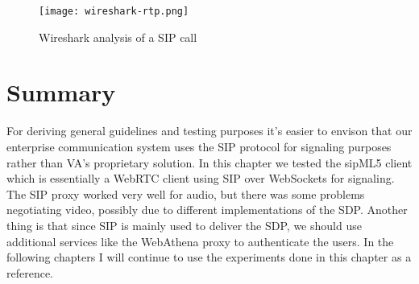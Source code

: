 \begin{figure}[here]
\centerline{\texttt{[image: wireshark-rtp.png]}}
\caption{Wireshark analysis of a SIP call}
\label{fig:wireshark-sip-call}
\end{figure}

\newpage
\section{Summary}
For deriving general guidelines and testing purposes it's easier to envison that our enterprise communication system uses the SIP protocol for signaling purposes rather than VA's proprietary solution. In this chapter we tested the sipML5 client which is essentially a WebRTC client using SIP over WebSockets for signaling. The SIP proxy worked very well for audio, but there was some problems negotiating video, possibly due to different implementations of the SDP. Another thing is that since SIP is mainly used to deliver the SDP, we should use additional services like the WebAthena proxy to authenticate the users. In the following chapters I will continue to use the experiments done in this chapter as a reference.